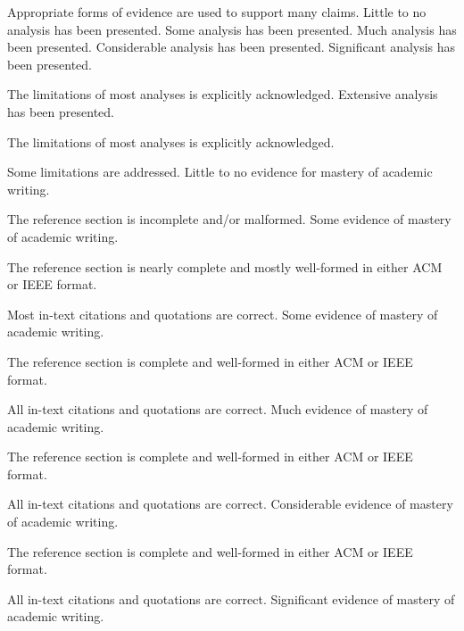 \documentclass{../fal_assignment}
\begin{document}
\begin{markingrubric}
      \par 		Appropriate forms of evidence are used to support many claims.
%
        \grade  \fail	Little to no analysis has been presented.
        \grade 		Some analysis has been presented. 
        \grade 		Much analysis has been presented.
        \grade 		Considerable analysis has been presented.
        \grade 		Significant analysis has been presented.
         \par		The limitations of most analyses is explicitly acknowledged.
         \grade 		Extensive analysis has been presented.
         \par		The limitations of most analyses is explicitly acknowledged.
	\par		Some limitations are addressed.
%
        \grade  \fail	Little to no evidence for mastery of academic writing.
        \par 		The reference section is incomplete and/or malformed.
        \grade 		Some evidence of mastery of academic writing.
        \par 		The reference section is nearly complete and mostly well-formed in either ACM or IEEE format.
        \par 		Most in-text citations and quotations are correct.
        \grade 		Some evidence of mastery of academic writing.
        \par 		The reference section is complete and well-formed in either ACM or IEEE format.
        \par 		All in-text citations and quotations are correct.
        \grade 		Much evidence of mastery of academic writing.
        \par 		The reference section is complete and well-formed in either ACM or IEEE format.
        \par 		All in-text citations and quotations are correct.
        \grade 		Considerable evidence of mastery of academic writing.
        \par 		The reference section is complete and well-formed in either ACM or IEEE format.
        \par 		All in-text citations and quotations are correct.
        \grade 		Significant evidence of mastery of academic writing.

\end{markingrubric}
\end{document}
